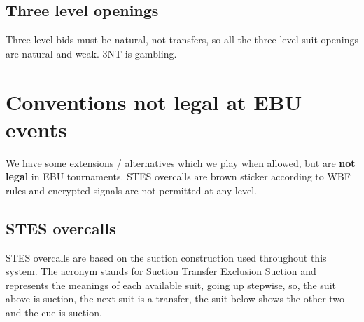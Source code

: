 \documentclass[a4paper,14pt]{extarticle}
\begin{document}
\subsection{Three level openings}

Three level bids must be natural, not transfers, so all the three level suit
openings are natural and weak. 3NT is gambling.

\newpage

\section{Conventions not legal at EBU events}
\label{sec:illegal}

We have some extensions / alternatives which we play when allowed, but are {\bf
not legal} in EBU tournaments. STES overcalls are brown sticker according to
WBF rules and encrypted signals are not permitted at any level.

\subsection{STES overcalls}
\label{sec:stes}

STES overcalls are based on the suction construction used throughout this
system.  The acronym stands for Suction Transfer Exclusion Suction and
represents the meanings of each available suit, going up stepwise, so, the suit
above is suction, the next suit is a transfer, the suit below shows the other
two and the cue is suction.
\end{document}
